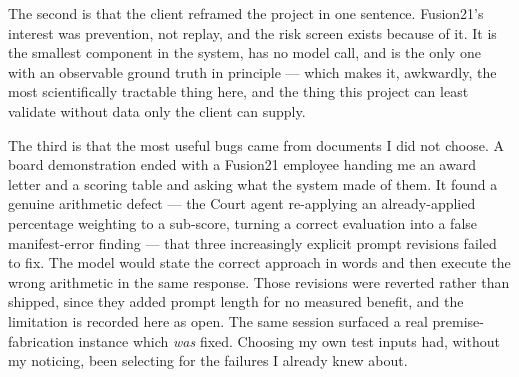 The second is that the client reframed the project in one sentence. Fusion21's
interest was prevention, not replay, and the risk screen exists because of it. It
is the smallest component in the system, has no model call, and is the only one
with an observable ground truth in principle --- which makes it, awkwardly, the
most scientifically tractable thing here, and the thing this project can least
validate without data only the client can supply.

The third is that the most useful bugs came from documents I did not choose. A
board demonstration ended with a Fusion21 employee handing me an award letter and
a scoring table and asking what the system made of them. It found a genuine
arithmetic defect --- the Court agent re-applying an already-applied percentage
weighting to a sub-score, turning a correct evaluation into a false manifest-error
finding --- that three increasingly explicit prompt revisions failed to fix. The
model would state the correct approach in words and then execute the wrong
arithmetic in the same response. Those revisions were reverted rather than
shipped, since they added prompt length for no measured benefit, and the
limitation is recorded here as open. The same session surfaced a real
premise-fabrication instance which \emph{was} fixed. Choosing my own test inputs
had, without my noticing, been selecting for the failures I already knew about.
